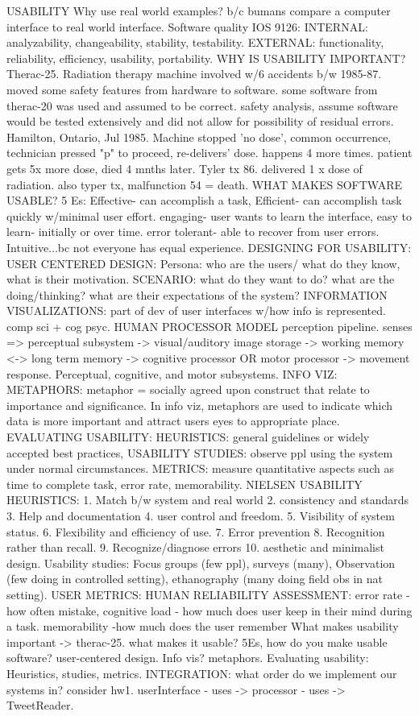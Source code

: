 \documentclass[10pt]{article}
\begin{document}
\begin{landscape}
\begin{multicols*}{6}
USABILITY
Why use real world examples? b/c bumans compare a computer interface to real world interface. Software quality IOS 9126: INTERNAL: analyzability, changeability, stability, testability. EXTERNAL: functionality, reliability, efficiency, usability, portability. WHY IS USABILITY IMPORTANT? Therac-25. Radiation therapy machine involved w/6 accidents b/w 1985-87. moved some safety features from hardware to software. some software from therac-20 was used and assumed to be correct. safety analysis, assume software would be tested extensively and did not allow for possibility of residual errors. Hamilton, Ontario, Jul 1985. Machine stopped 'no dose', common occurrence, technician pressed "p" to proceed, re-delivers' dose. happens 4 more times. patient gets 5x more dose, died 4 mnths later. Tyler tx 86. delivered 1 x dose of radiation. also typer tx, malfunction 54 = death. WHAT MAKES SOFTWARE USABLE? 5 Es: Effective- can accomplish a task, Efficient- can accomplish task quickly w/minimal user effort. engaging- user wants to learn the interface, easy to learn- initially or over time. error tolerant- able to recover from user errors. Intuitive...bc not everyone has equal experience. DESIGNING FOR USABILITY: USER CENTERED DESIGN: Persona: who are the users/ what do they know, what is their motivation. SCENARIO: what do they want to do? what are the doing/thinking? what are their expectations of the system? INFORMATION VISUALIZATIONS: part of dev of user interfaces w/how info is represented. comp sci + cog psyc. HUMAN PROCESSOR MODEL perception pipeline. senses => perceptual subsystem -> visual/auditory image storage -> working memory <-> long term memory -> cognitive processor OR motor processor -> movement response. Perceptual, cognitive, and motor subsystems. INFO VIZ: METAPHORS: metaphor = socially agreed upon construct that relate to importance and significance. In info viz, metaphors are used to indicate which data is more important and attract users eyes to appropriate place. EVALUATING USABILITY: HEURISTICS: general guidelines or widely accepted best practices, USABILITY STUDIES: observe ppl using the system under normal circumstances. METRICS: measure quantitative aspects such as time to complete task, error rate, memorability. NIELSEN USABILITY HEURISTICS: 1. Match b/w system and real world 2. consistency and standards 3. Help and documentation 4. user control and freedom. 5. Visibility of system status. 6. Flexibility and efficiency of use. 7. Error prevention 8. Recognition rather than recall. 9. Recognize/diagnose errors 10. aesthetic and minimalist design. Usability studies: Focus groups (few ppl), surveys (many), Observation (few doing in controlled setting), ethanography (many doing field obs in nat setting). USER METRICS: HUMAN RELIABILITY ASSESSMENT: error rate - how often mistake, cognitive load - how much does user keep in their mind during a task. memorability -how much does the user remember  What makes usability important -> therac-25. what makes it usable? 5Es, how do you make usable software? user-centered design. Info vis? metaphors. Evaluating usability: Heuristics, studies, metrics. INTEGRATION: what order do we implement our systems in? consider hw1. userInterface - uses -> processor - uses -> TweetReader. 
\end{multicols*}
\end{landscape}
\end{document}
